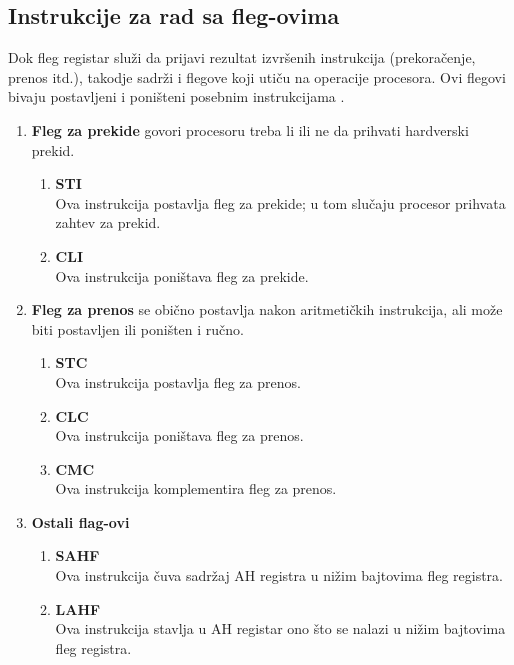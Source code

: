 \documentclass[a4paper]{article}
\begin{document}
\subsection{\textbf{Instrukcije za rad sa fleg-ovima}}
Dok fleg registar slu\v zi da prijavi rezultat izvr\v senih instrukcija (prekora\v cenje, prenos itd.),
takodje sadr\v zi i flegove koji uti\v cu na operacije procesora. Ovi flegovi bivaju postavljeni i poni\v steni 
posebnim instrukcijama \cite{x86Assembly}.
\begin{enumerate}

\item{\textbf{Fleg za prekide}} govori procesoru treba li ili ne da prihvati hardverski prekid.
	\begin{enumerate}
	\item{\textbf{STI}}\\
	Ova instrukcija postavlja fleg za prekide; u tom slu\v caju procesor prihvata zahtev za prekid.
	\item{\textbf{CLI}}\\ 
	Ova instrukcija poni\v stava fleg za prekide.
	\end{enumerate}
	
\item{\textbf{Fleg za prenos}} se obi\v cno postavlja nakon aritmeti\v ckih instrukcija, ali mo\v ze biti postavljen ili poni\v sten i ru\v cno.
	\begin{enumerate}
	\item{\textbf{STC}}\\
	Ova instrukcija postavlja fleg za prenos.
	\item{\textbf{CLC}}\\ 
	Ova instrukcija poni\v stava fleg za prenos.
	\item{\textbf{CMC}}\\
	Ova instrukcija komplementira fleg za prenos.
	\end{enumerate}
	
\item{\textbf{Ostali flag-ovi}}
	\begin{enumerate}
	\item{\textbf{SAHF}}\\
	Ova instrukcija \v cuva sadr\v zaj AH registra u ni\v zim bajtovima fleg registra.
	\item{\textbf{LAHF}}\\ 
	Ova instrukcija stavlja u AH registar ono \v sto se nalazi u ni\v zim bajtovima fleg registra.
	\end{enumerate}

\end{enumerate} %
\end{document}
